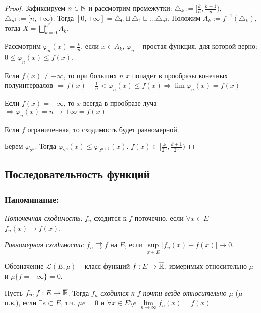 \begin{proof}
    Зафиксируем $n\in \mathbb{N}$ и рассмотрим промежутки: $\triangle_k:=[\frac{k}{n}, \frac{k+1}{n})$, $\triangle_{n^2}:=[n, +\infty)$.
    Тогда $[0, +\infty]=\triangle_0\sqcup\triangle_1\sqcup ...\triangle_{n^2}$. Положим $A_k:=f^{-1}(\triangle_k)$, тогда $X=\bigsqcup\limits_{k=0}^{n^2}A_k$.

    Рассмотрим $\varphi_n(x)=\frac{k}{n}$, если $x\in A_k$, $\varphi_n$ – простая функция, для которой верно: $0\leq \varphi_n(x) \leq f(x)$.

    Если $f(x)\not = +\infty$, то при больших $n$ $x$ попадет в прообразы конечных полуинтервалов 
    $\Rightarrow f(x)-\frac{1}{n}< \varphi_n(x)\leq f(x)\Rightarrow \lim \varphi_n(x)=f(x)$

    Если $f(x)=+\infty$, то $x$ всегда в прообразе луча $\Rightarrow\varphi_n(x) = n \rightarrow +\infty=f(x)$

    Если $f$ ограниченная, то сходимость будет равномерной.

    Берем $\varphi_{2^n}$. Тогда $\varphi_{2^n}(x)\leq \varphi_{2^{n+1}}(x)$. $f(x)\in [\frac{k}{2^n}, \frac{k+1}{2^{n}})$
\end{proof}

\subsection{Последовательность функций}

\subsubsection*{Напоминание:}

\textit{Поточечная сходимость:} $f_n$ сходится к $f$ поточечно, если $\forall x\in E$
$f_n (x)\rightarrow f(x)$.

\textit{Равномерная сходимость:} $f_n\rightrightarrows f$ на $E$, если $\underset{x\in E}{\sup} |f_n(x)-f(x)|\rightarrow 0$.

Обозначение $\mathcal{L}(E, \mu)$ – класс функций $f:E\rightarrow \overline{\mathbb{R}}$, измеримых относительно
$\mu$ и $\mu \{f=\pm \infty\}=0$.

\begin{definition}
    Пусть $f_n, f:E\rightarrow \overline{\mathbb{R}}$. Тогда \textit{$f_n$ сходится к $f$ почти везде относительно $\mu$} ($\mu$ п.в.),
    если $\exists e\subset E$, т.ч. $\mu e=0$ и $\forall x\in E\setminus e$ $\lim\limits_{n\rightarrow \infty} f_n(x)=f(x)$
\end{definition}


